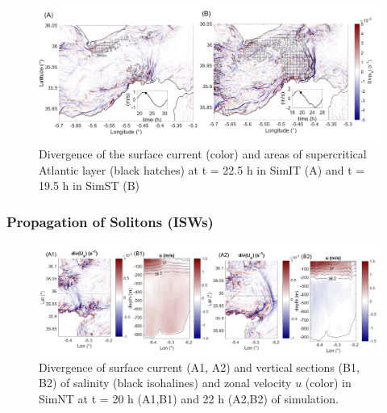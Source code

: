 
\begin{figure}[!h]
 \centering
\includegraphics[width=\linewidth]{./GBR3D/FigWaveCont.png}
 \caption {Divergence of the surface current (color) and areas of supercritical Atlantic layer (black hatches) at t = 22.5 h in SimIT (A) and t = 19.5 h in SimST (B)}
 \label{FigISWGBR3D}
\end{figure}

\subsubsection{Propagation of Solitons (ISWs)}
\label{section_sim3D_ISW}

\begin{figure}[!h]
 \centering
 \includegraphics[width=1.\textwidth]{./GBR3D/coupesISW_ME2-2.png}
 \caption {Divergence of surface current (A1, A2) and vertical sections (B1, B2) of salinity (black isohalines) and zonal velocity $u$ (color) in SimNT at t = 20 h (A1,B1) and 22 h (A2,B2) of simulation.}
  \label{FigISWNT}
\end{figure}

